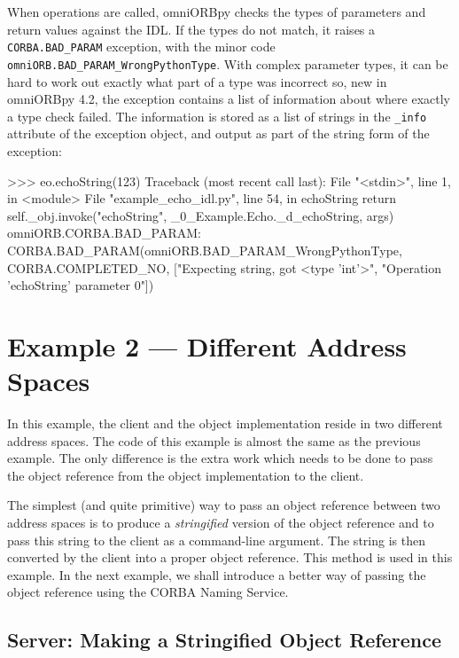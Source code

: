 \documentclass[11pt,oneside,a4paper]{book}
\newcommand{\code}[1]{\texttt{#1}}
\newcommand{\term}[1]{\textit{#1}}
\begin{document}
When operations are called, omniORBpy checks the types of parameters
and return values against the IDL. If the types do not match, it
raises a \code{CORBA.BAD\_PARAM} exception, with the minor code
\code{omniORB.BAD\_PARAM\_WrongPythonType}. With complex parameter
types, it can be hard to work out exactly what part of a type was
incorrect so, new in omniORBpy 4.2, the exception contains a list of
information about where exactly a type check failed. The information
is stored as a list of strings in the \code{\_info} attribute of the
exception object, and output as part of the string form of the
exception:

\begin{pylisting}
>>> eo.echoString(123)
Traceback (most recent call last):
  File "<stdin>", line 1, in <module>
  File "example_echo_idl.py", line 54, in echoString
    return self._obj.invoke("echoString", _0_Example.Echo._d_echoString, args)
omniORB.CORBA.BAD_PARAM: CORBA.BAD_PARAM(omniORB.BAD_PARAM_WrongPythonType,
  CORBA.COMPLETED_NO, ["Expecting string, got <type 'int'>",
                       "Operation 'echoString' parameter 0"])
\end{pylisting}



\section{Example 2 --- Different Address Spaces}

In this example, the client and the object implementation reside in
two different address spaces. The code of this example is almost the
same as the previous example. The only difference is the extra work
which needs to be done to pass the object reference from the object
implementation to the client.

The simplest (and quite primitive) way to pass an object reference
between two address spaces is to produce a \term{stringified} version
of the object reference and to pass this string to the client as a
command-line argument.  The string is then converted by the client
into a proper object reference.  This method is used in this
example. In the next example, we shall introduce a better way of
passing the object reference using the CORBA Naming Service.


\subsection{Server: Making a Stringified Object Reference}
\end{document}
